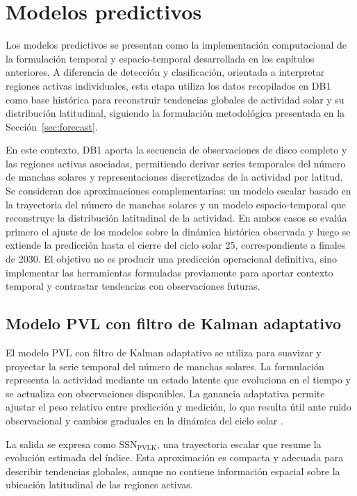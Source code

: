 \section{Modelos predictivos}

Los modelos predictivos se presentan como la implementación computacional de la
formulación temporal y espacio-temporal desarrollada en los capítulos anteriores.
A diferencia de detección y clasificación, orientada a interpretar
regiones activas individuales, esta etapa utiliza los datos recopilados en DB1
como base histórica para reconstruir tendencias globales de actividad solar y su
distribución latitudinal, siguiendo la formulación metodológica presentada en la
Sección~\ref{sec:forecast}.

En este contexto, DB1 aporta la secuencia de observaciones de disco completo y
las regiones activas asociadas, permitiendo derivar series temporales del número
de manchas solares y representaciones discretizadas de la actividad por latitud.
Se consideran dos aproximaciones complementarias: un modelo escalar basado en la
trayectoria del número de manchas solares y un modelo espacio-temporal que
reconstruye la distribución latitudinal de la actividad. En ambos casos se evalúa
primero el ajuste de los modelos sobre la dinámica histórica observada y luego se
extiende la predicción hasta el cierre del ciclo solar 25, correspondiente a
finales de 2030. El objetivo no es producir una predicción operacional
definitiva, sino implementar las herramientas formuladas previamente para aportar
contexto temporal y contrastar tendencias con observaciones futuras.

\subsection{Modelo PVL con filtro de Kalman adaptativo}

El modelo PVL con filtro de Kalman adaptativo se utiliza para suavizar y proyectar
la serie temporal del número de manchas solares. La formulación representa la
actividad mediante un estado latente que evoluciona en el tiempo y se actualiza
con observaciones disponibles. La ganancia adaptativa permite ajustar el peso
relativo entre predicción y medición, lo que resulta útil ante ruido observacional
y cambios graduales en la dinámica del ciclo solar
\citep{kalman1960newapproach,podladchikova2012kalman}.

La salida se expresa como $\mathrm{SSN}_{\mathrm{PVLK}}$, una trayectoria escalar
que resume la evolución estimada del índice. Esta aproximación es compacta y
adecuada para describir tendencias globales, aunque no contiene información
espacial sobre la ubicación latitudinal de las regiones activas.


